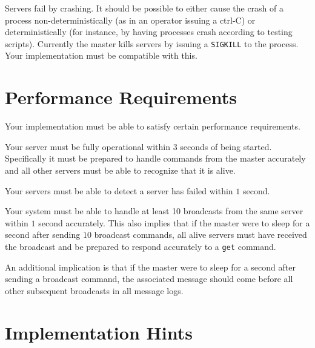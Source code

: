\documentclass[11pt]{article}
\begin{document}
    Servers fail by crashing.
    It should be possible to either cause the crash of a process non-deterministically (as in an operator issuing a ctrl-C) or deterministically (for instance, by having processes crash according to testing scripts).
    Currently the master kills servers by issuing a \texttt{SIGKILL} to the process.
    Your implementation must be compatible with this.

    \section{Performance Requirements}\label{sec:performanceRequirements}
    Your implementation must be able to satisfy certain performance requirements.

    \begin{compactitem}
        \item Your server must be fully operational within $3$ seconds of being started.
        Specifically it must be prepared to handle commands from the master accurately and all other servers must be able to recognize that it is alive.
        \item Your servers must be able to detect a server has failed within $1$ second.
        \item Your system must be able to handle at least 10 broadcasts from the same server within $1$ second accurately.
        This also implies that if the master were to sleep for a second after sending $10$ broadcast commands, all alive servers must have received the broadcast and be prepared to respond accurately to a \texttt{get} command.
        \item An additional implication is that if the master were to sleep for a second after sending a broadcast command, the associated message should come before all other subsequent broadcasts in all message logs.
    \end{compactitem}

    \section{Implementation Hints}\label{sec:implementationHints}
\end{document}

